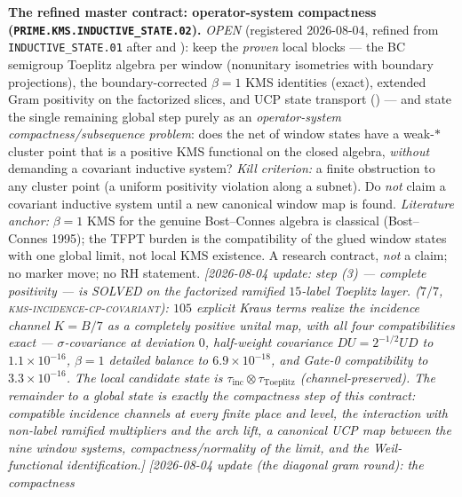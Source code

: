 \par\smallskip\noindent\textbf{The refined master contract:
operator-system compactness
(\texttt{PRIME.KMS.INDUCTIVE\_STATE.02}).}
{\sloppy
\emph{OPEN} (registered 2026-08-04, refined from
\texttt{INDUCTIVE\_STATE.01} after
 and
): keep the \emph{proven}
local blocks --- the BC semigroup Toeplitz algebra per window
(nonunitary isometries with boundary projections), the
boundary-corrected $\beta=1$ KMS identities (exact), extended Gram
positivity on the factorized slices, and UCP state transport
() --- and state the single
remaining global step purely as an \emph{operator-system
compactness/subsequence problem}: does the net of window states
have a weak-$*$ cluster point that is a positive KMS functional on
the closed algebra, \emph{without} demanding a covariant inductive
system?  \emph{Kill criterion:} a finite obstruction to any cluster
point (a uniform positivity violation along a subnet).  Do
\emph{not} claim a covariant inductive system until a new canonical
window map is found.  \emph{Literature anchor:} $\beta=1$ KMS for
the genuine Bost--Connes algebra is classical (Bost--Connes 1995);
the TFPT burden is the compatibility of the glued window states
with one global limit, not local KMS existence.  A research
contract, \emph{not} a claim; no marker move; no RH statement.
\emph{[2026-08-04 update: step (3) --- complete positivity --- is
SOLVED on the factorized ramified $15$-label Toeplitz layer.
 ($7/7$,
\textsc{kms-incidence-cp-covariant}): $105$ explicit Kraus terms
realize the incidence channel $K=B/7$ as a completely positive
unital map, with all four compatibilities exact ---
$\sigma$-covariance at deviation $0$, half-weight covariance
$DU=2^{-1/2}UD$ to $1.1\times10^{-16}$, $\beta=1$ detailed balance
to $6.9\times10^{-18}$, and Gate-0 compatibility to
$3.3\times10^{-16}$.  The local candidate state is
$\tau_{\mathrm{inc}}\otimes\tau_{\mathrm{Toeplitz}}$
(channel-preserved).  The remainder to a global state is exactly
the compactness step of this contract: compatible incidence
channels at every finite place and level, the interaction with
non-label ramified multipliers and the arch lift, a canonical UCP
map between the nine window systems, compactness/normality of the
limit, and the Weil-functional identification.]}
\emph{[2026-08-04 update (the diagonal gram round): the compactness
}}
